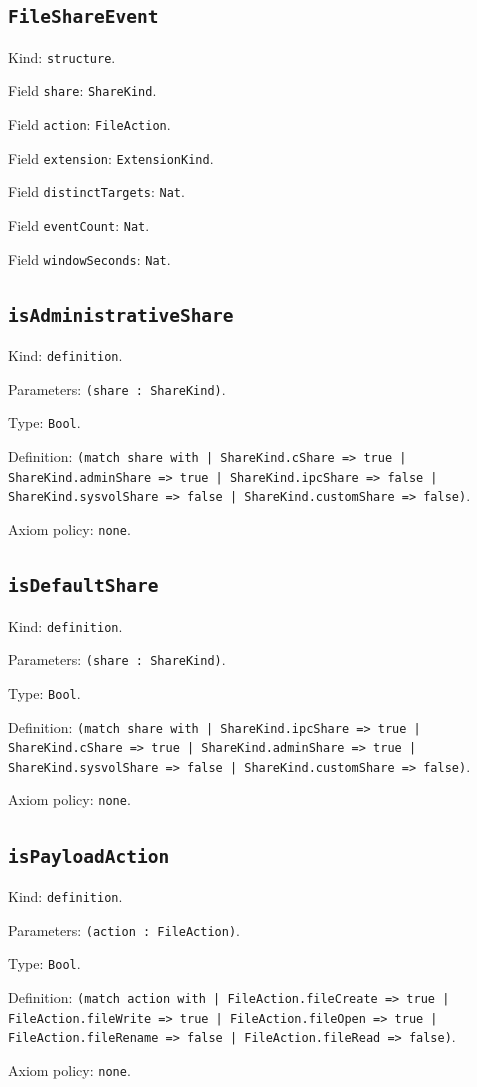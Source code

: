 \documentclass[11pt]{article}
\begin{document}
\subsection*{\texttt{FileShareEvent}}
\noindent Kind: \texttt{structure}.\par
\noindent Field \texttt{share}: \texttt{ShareKind}.\par
\noindent Field \texttt{action}: \texttt{FileAction}.\par
\noindent Field \texttt{extension}: \texttt{ExtensionKind}.\par
\noindent Field \texttt{distinctTargets}: \texttt{Nat}.\par
\noindent Field \texttt{eventCount}: \texttt{Nat}.\par
\noindent Field \texttt{windowSeconds}: \texttt{Nat}.\par
\subsection*{\texttt{isAdministrativeShare}}
\noindent Kind: \texttt{definition}.\par
\noindent Parameters: \texttt{(share : ShareKind)}.\par
\noindent Type: \texttt{Bool}.\par
\noindent Definition: \texttt{(match share with | ShareKind.cShare => true | ShareKind.adminShare => true | ShareKind.ipcShare => false | ShareKind.sysvolShare => false | ShareKind.customShare => false)}.\par
\noindent Axiom policy: \texttt{none}.\par
\subsection*{\texttt{isDefaultShare}}
\noindent Kind: \texttt{definition}.\par
\noindent Parameters: \texttt{(share : ShareKind)}.\par
\noindent Type: \texttt{Bool}.\par
\noindent Definition: \texttt{(match share with | ShareKind.ipcShare => true | ShareKind.cShare => true | ShareKind.adminShare => true | ShareKind.sysvolShare => false | ShareKind.customShare => false)}.\par
\noindent Axiom policy: \texttt{none}.\par
\subsection*{\texttt{isPayloadAction}}
\noindent Kind: \texttt{definition}.\par
\noindent Parameters: \texttt{(action : FileAction)}.\par
\noindent Type: \texttt{Bool}.\par
\noindent Definition: \texttt{(match action with | FileAction.fileCreate => true | FileAction.fileWrite => true | FileAction.fileOpen => true | FileAction.fileRename => false | FileAction.fileRead => false)}.\par
\noindent Axiom policy: \texttt{none}.\par
\end{document}
